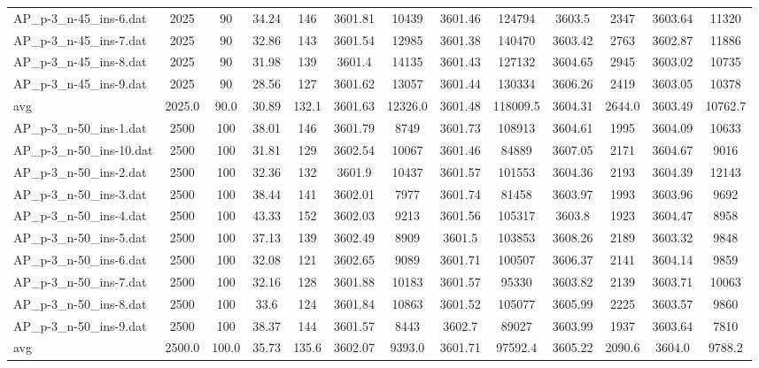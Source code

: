 \begin{table}[!ht]
{\begin{tabular}{lcccccccccccc}
AP\_p-3\_n-45\_ins-6.dat & 2025 & 90 & 34.24 & 146 & 3601.81 & 10439 & 3601.46 & 124794 & 3603.5 & 2347 & 3603.64 & 11320 \\
AP\_p-3\_n-45\_ins-7.dat & 2025 & 90 & 32.86 & 143 & 3601.54 & 12985 & 3601.38 & 140470 & 3603.42 & 2763 & 3602.87 & 11886 \\
AP\_p-3\_n-45\_ins-8.dat & 2025 & 90 & 31.98 & 139 & 3601.4 & 14135 & 3601.43 & 127132 & 3604.65 & 2945 & 3603.02 & 10735 \\
AP\_p-3\_n-45\_ins-9.dat & 2025 & 90 & 28.56 & 127 & 3601.62 & 13057 & 3601.44 & 130334 & 3606.26 & 2419 & 3603.05 & 10378 \\
\hline avg & 2025.0 & 90.0 & 30.89& 132.1 & 3601.63& 12326.0 & 3601.48& 118009.5 & 3604.31& 2644.0 & 3603.49& 10762.7\\ \hline
AP\_p-3\_n-50\_ins-1.dat & 2500 & 100 & 38.01 & 146 & 3601.79 & 8749 & 3601.73 & 108913 & 3604.61 & 1995 & 3604.09 & 10633 \\
AP\_p-3\_n-50\_ins-10.dat & 2500 & 100 & 31.81 & 129 & 3602.54 & 10067 & 3601.46 & 84889 & 3607.05 & 2171 & 3604.67 & 9016 \\
AP\_p-3\_n-50\_ins-2.dat & 2500 & 100 & 32.36 & 132 & 3601.9 & 10437 & 3601.57 & 101553 & 3604.36 & 2193 & 3604.39 & 12143 \\
AP\_p-3\_n-50\_ins-3.dat & 2500 & 100 & 38.44 & 141 & 3602.01 & 7977 & 3601.74 & 81458 & 3603.97 & 1993 & 3603.96 & 9692 \\
AP\_p-3\_n-50\_ins-4.dat & 2500 & 100 & 43.33 & 152 & 3602.03 & 9213 & 3601.56 & 105317 & 3603.8 & 1923 & 3604.47 & 8958 \\
AP\_p-3\_n-50\_ins-5.dat & 2500 & 100 & 37.13 & 139 & 3602.49 & 8909 & 3601.5 & 103853 & 3608.26 & 2189 & 3603.32 & 9848 \\
AP\_p-3\_n-50\_ins-6.dat & 2500 & 100 & 32.08 & 121 & 3602.65 & 9089 & 3601.71 & 100507 & 3606.37 & 2141 & 3604.14 & 9859 \\
AP\_p-3\_n-50\_ins-7.dat & 2500 & 100 & 32.16 & 128 & 3601.88 & 10183 & 3601.57 & 95330 & 3603.82 & 2139 & 3603.71 & 10063 \\
AP\_p-3\_n-50\_ins-8.dat & 2500 & 100 & 33.6 & 124 & 3601.84 & 10863 & 3601.52 & 105077 & 3605.99 & 2225 & 3603.57 & 9860 \\
AP\_p-3\_n-50\_ins-9.dat & 2500 & 100 & 38.37 & 144 & 3601.57 & 8443 & 3602.7 & 89027 & 3603.99 & 1937 & 3603.64 & 7810 \\
\hline avg & 2500.0 & 100.0 & 35.73& 135.6 & 3602.07& 9393.0 & 3601.71& 97592.4 & 3605.22& 2090.6 & 3604.0& 9788.2\\ \hline

\end{tabular}}
\end{table}

